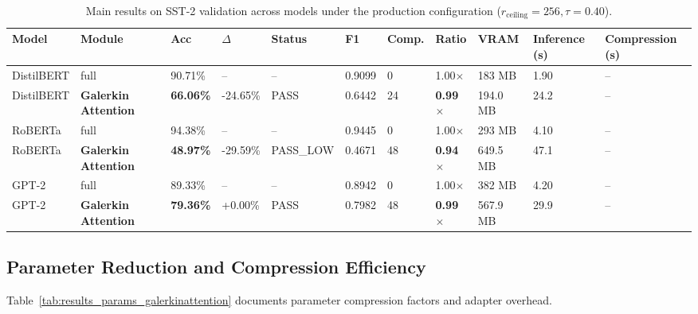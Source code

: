 \begin{table}[t]
\centering
\small
\begin{tabular}{lllllllllll}
\toprule
\textbf{Model} & \textbf{Module} & \textbf{Acc} & \textbf{$\Delta$} & \textbf{Status} & \textbf{F1} & \textbf{Comp.} & \textbf{Ratio} & \textbf{VRAM} & \textbf{Inference (s)} & \textbf{Compression (s)} \\
\midrule
DistilBERT & full & 90.71\% & -- & -- & 0.9099 & 0 & 1.00$\times$ & 183 MB & 1.90 & -- \\
DistilBERT & \textbf{Galerkin Attention} & \textbf{66.06\%} & -24.65\% & PASS & 0.6442 & 24 & \textbf{0.99$\times$} & 194.0 MB & 24.2 & -- \\
RoBERTa & full & 94.38\% & -- & -- & 0.9445 & 0 & 1.00$\times$ & 293 MB & 4.10 & -- \\
RoBERTa & \textbf{Galerkin Attention} & \textbf{48.97\%} & -29.59\% & PASS_LOW & 0.4671 & 48 & \textbf{0.94$\times$} & 649.5 MB & 47.1 & -- \\
GPT-2 & full & 89.33\% & -- & -- & 0.8942 & 0 & 1.00$\times$ & 382 MB & 4.20 & -- \\
GPT-2 & \textbf{Galerkin Attention} & \textbf{79.36\%} & +0.00\% & PASS & 0.7982 & 48 & \textbf{0.99$\times$} & 567.9 MB & 29.9 & -- \\
\bottomrule
\end{tabular}
\caption{Main results on SST-2 validation across models under the production configuration ($r_{\mathrm{ceiling}}=256, \tau=0.40$).}
\label{tab:main_sst2}
\end{table}

\subsection{Parameter Reduction and Compression Efficiency}
Table~\ref{tab:results_params_galerkinattention} documents parameter compression factors and adapter overhead.

